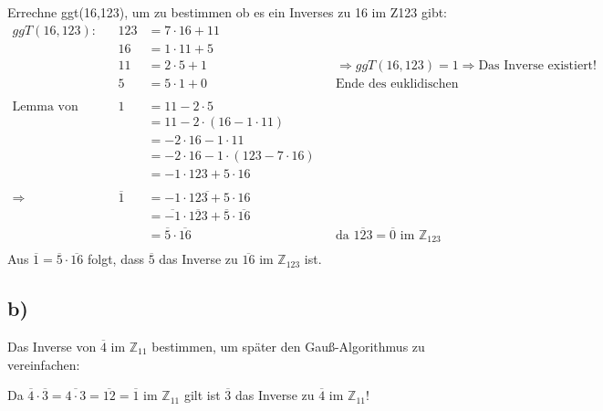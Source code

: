 \documentclass[]{article}
\newcommand{\T}[1]{\overline{#1}}
\newcommand{\rarr}{\Rightarrow}
\begin{document}
Errechne ggt(16,123), um zu bestimmen ob es ein Inverses zu 16 im Z123 gibt:
\begin{align*}
	ggT(16,123):&& 123&= 7 \cdot 16 + 11&&\\
	&& 16&= 1 \cdot 11 + 5&&\\
	&& 11&= 2 \cdot 5 + 1&&\rarr ggT(16,123) = 1 \rarr \text{Das Inverse existiert!}\\
	&& 5&= 5 \cdot 1 + 0&&\text{Ende des euklidischen Algorithmus}\\
	\\
	\text{Lemma von Bézout:} && 1&= 11 - 2 \cdot 5 &&\\
	&& &= 11 - 2 \cdot (16-1\cdot 11) &&\\
	&& &= - 2 \cdot 16 - 1 \cdot 11&&\\
	&& &= - 2 \cdot 16 - 1 \cdot (123 - 7 \cdot 16)&&\\
	&& &= - 1 \cdot 123 + 5 \cdot 16&&\\
	\\
	\rarr&& \T{1}&= \T{- 1 \cdot 123 + 5 \cdot 16}&&\\
	&& &= \T{- 1} \cdot \T{123} + \T{5} \cdot \T{16}&&\\
	&& &= \T{5} \cdot \T{16}&&\text{da $\T{123} = \T{0}$ im $\mathbb{Z}_{123}$}\\
\end{align*}
Aus $\T{1} = \T{5} \cdot \T{16}$ folgt, dass $\T{5}$ das Inverse zu $\T{16}$ im $\mathbb{Z}_{123}$ ist.

\subsection*{b)}
Das Inverse von $\T{4}$ im $\mathbb{Z}_{11}$ bestimmen, um später den Gauß-Algorithmus zu vereinfachen:

Da $\T{4} \cdot \T{3}= \T{4 \cdot 3} = \T{12} = \T{1}$ im $\mathbb{Z}_{11}$ gilt ist $\T{3}$ das Inverse zu $\T{4}$ im $\mathbb{Z}_{11}$!
\end{document}
